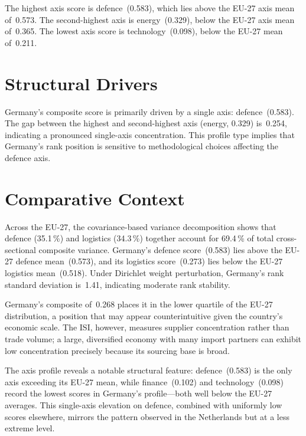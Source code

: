 \documentclass[12pt,a4paper]{article}
\begin{document}
The highest axis score is defence~(0.583), which lies above the EU-27 axis mean of~0.573.  The second-highest axis is energy~(0.329), below the EU-27 axis mean of~0.365.  The lowest axis score is technology~(0.098), below the EU-27 mean of~0.211.


\section{Structural Drivers}
\label{sec:drivers}

\begin{sloppypar}
Germany's composite score is primarily driven by a single axis: defence~(0.583).  The gap between the highest and second-highest axis (energy, 0.329) is~0.254, indicating a pronounced single-axis concentration.  This profile type implies that Germany's rank position is sensitive to methodological choices affecting the defence axis.
\end{sloppypar}


\section{Comparative Context}
\label{sec:comparative}

Across the EU-27, the covariance-based variance decomposition shows that defence (35.1\,\%) and logistics (34.3\,\%) together account for 69.4\,\% of total cross-sectional composite variance.  Germany's defence score~(0.583) lies above the EU-27 defence mean~(0.573), and its logistics score~(0.273) lies below the EU-27 logistics mean~(0.518).  Under Dirichlet weight perturbation, Germany's rank standard deviation is~1.41, indicating moderate rank stability.



Germany's composite of~0.268 places it in the lower quartile of the EU-27 distribution, a position that may appear counterintuitive given the country's economic scale.  The ISI, however, measures supplier concentration rather than trade volume; a large, diversified economy with many import partners can exhibit low concentration precisely because its sourcing base is broad.

The axis profile reveals a notable structural feature: defence~(0.583) is the only axis exceeding its EU-27 mean, while finance~(0.102) and technology~(0.098) record the lowest scores in Germany's profile---both well below the EU-27 averages.  This single-axis elevation on defence, combined with uniformly low scores elsewhere, mirrors the pattern observed in the Netherlands but at a less extreme level.
\end{document}
